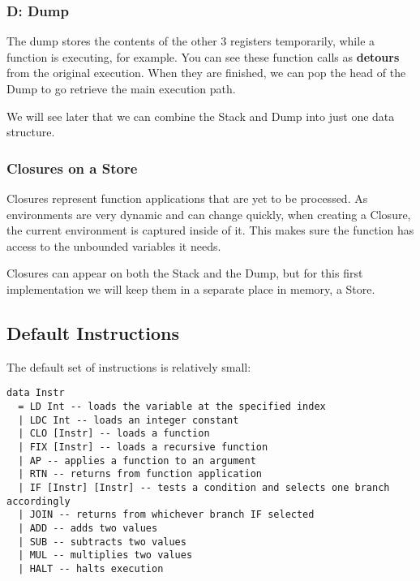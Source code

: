 \subsubsection{D: Dump}
The dump stores the contents of the other 3 registers temporarily, while a function is executing, for example.
You can see these function calls as \textbf{detours} from the original execution. When they are finished, 
we can pop the head of the Dump to go retrieve the main execution path.

We will see later that we can combine the Stack and Dump into just one data structure.
\subsubsection{Closures on a Store}
Closures represent function applications that are yet to be processed. As environments are very dynamic and can change quickly, when creating a Closure, the current environment
is captured inside of it. This makes sure the function has access to the unbounded variables it needs.

Closures can appear on both the Stack and the Dump, but for this first implementation we will keep them in a separate place in memory,
a Store.

\subsection{Default Instructions}
The default set of instructions is relatively small:
\begin{lstlisting}
data Instr
  = LD Int -- loads the variable at the specified index 
  | LDC Int -- loads an integer constant
  | CLO [Instr] -- loads a function
  | FIX [Instr] -- loads a recursive function
  | AP -- applies a function to an argument
  | RTN -- returns from function application
  | IF [Instr] [Instr] -- tests a condition and selects one branch accordingly
  | JOIN -- returns from whichever branch IF selected
  | ADD -- adds two values
  | SUB -- subtracts two values
  | MUL -- multiplies two values
  | HALT -- halts execution
\end{lstlisting}

